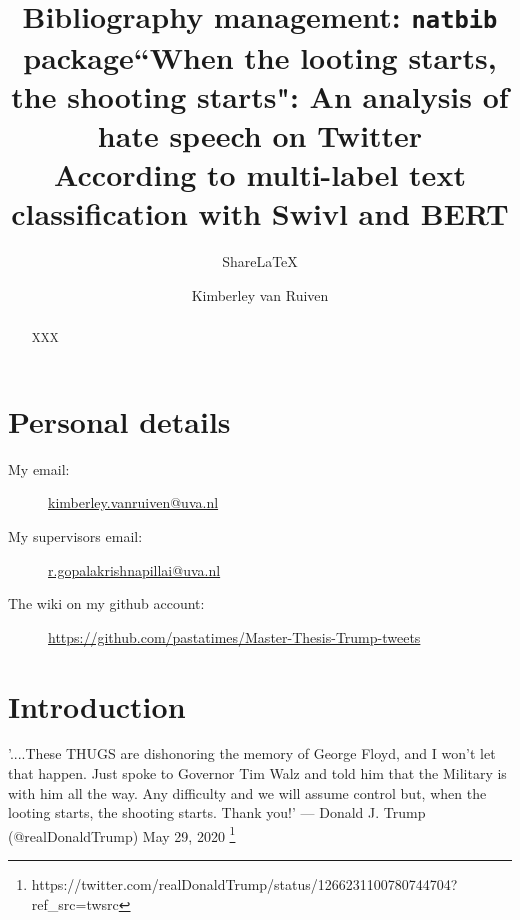 \documentclass[a4paper,pdf]{article}
\title{Bibliography management: \texttt{natbib} package}
\author{Share\LaTeX}
\date { }
\begin{document}
\title{“When the looting starts, the shooting starts": An analysis of hate speech on Twitter\\
\large  According to multi-label text classification with Swivl and BERT} 
\author{Kimberley van Ruiven}

\maketitle

\todototoc
\listoftodos
\tableofcontents

\begin{abstract}XXX

\end{abstract}

\section{Personal details}

\begin{description}
 \item[My email:] \url{ kimberley.vanruiven@uva.nl }
 \item[My supervisors email:] \url{r.gopalakrishnapillai@uva.nl }
 \item[The wiki on my github account:] \url{https://github.com/pastatimes/Master-Thesis-Trump-tweets}
 \end{description} 

\section{Introduction}


    '....These THUGS are dishonoring the memory of George Floyd, and I won’t let that happen. Just spoke to Governor Tim Walz and told him that the Military is with him all the way. Any difficulty and we will assume control but, when the looting starts, the shooting starts. Thank you!'
    — Donald J. Trump (@realDonaldTrump) May 29, 2020 \footnote{https://twitter.com/realDonaldTrump/status/1266231100780744704?ref_src=twsrc} \\ 

\end{document}
